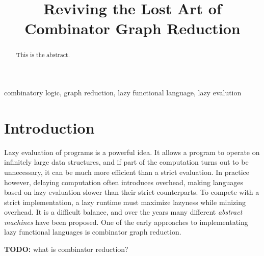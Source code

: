 \documentclass[conference]{IEEEtran}
\begin{document}
\title{Reviving the Lost Art of Combinator Graph Reduction}

\author{
}

\maketitle

\begin{abstract}
    This is the abstract.
\end{abstract}

\begin{IEEEkeywords}
    combinatory logic, graph reduction, lazy functional language, lazy evalution
\end{IEEEkeywords}

\section{Introduction}
Lazy evaluation of programs is a powerful idea.
It allows a program to operate on infinitely large data structures, and if part of the computation turns out to be unnecessary, it can be much more efficient than a strict evaluation.
In practice however, delaying computation often introduces overhead, making languages based on lazy evaluation slower than their strict counterparts.
To compete with a strict implementation, a lazy runtime must maximize lazyness while minizing overhead.
It is a difficult balance, and over the years many different \textit{abstract machines} have been proposed\cite{kieburtz_g-machine_1985,fairbairn_tim_1987,burn_spineless_1988,koopman_fresh_1989,jones_implementing_nodate}.
One of the early approaches to implementating lazy functional languages is combinator graph reduction\cite{turner_new_1979}.

\textbf{TODO:} what is combinator reduction?
\end{document}
